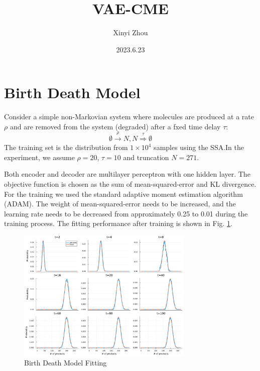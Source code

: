 \documentclass[a4paper,10pt]{article}
\title{VAE-CME}
\author{Xinyi Zhou}
\date{2023.6.23}
\begin{document}
\tableofcontents
\maketitle

\section{Birth Death Model}
Consider a simple non-Markovian system where molecules are produced at a rate $\rho$ and are removed from the system (degraded) after a fxed time delay $\tau$:
\begin{equation}\label{birth-death}
\emptyset\stackrel{\rho}\rightarrow N, N\stackrel{\tau}\Rightarrow\emptyset
\end{equation}
The training set is the distribution from $1 \times 10^4$ samples using the SSA.In the experiment, we assume $\rho=20$, $\tau=10$ and truncation $N=271$. 

Both encoder and decoder are multilayer perceptron with one hidden layer. The objective function is chosen as the sum of mean-squared-error and KL divergence. For the training we used the standard adaptive moment estimation algorithm (ADAM). The weight of mean-squared-error needs to be increased, and the learning rate needs to be decreased from approximately 0.25 to 0.01 during the training process. The fitting performance after training is shown in Fig. \ref{Birth Death Model Fitting}.

\begin{figure}[h]
	\centering
	\includegraphics[width=0.75\textwidth]{Figs/Birth_Death_fitting.pdf}
	\caption{Birth Death Model Fitting}\label{Birth Death Model Fitting}  
\end{figure}
\end{document}
